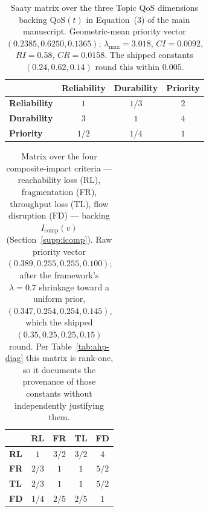 \documentclass[preprint,3p]{elsarticle}
\begin{document}
\begin{table}[htbp]
\centering
\small
\caption{Saaty matrix over the three Topic QoS dimensions backing $\text{QoS}(t)$ in Equation~(3) of the main manuscript. Geometric-mean priority vector $(0.2385, 0.6250, 0.1365)$; $\lambda_{\max} = 3.018$, $CI = 0.0092$, $RI = 0.58$, $CR = 0.0158$. The shipped constants $(0.24, 0.62, 0.14)$ round this within $0.005$.}
\label{tab:ahp-qos}
\begin{tabular}{lccc}
\toprule
 & \textbf{Reliability} & \textbf{Durability} & \textbf{Priority} \\
\midrule
\textbf{Reliability} & $1$ & $1/3$ & $2$ \\
\textbf{Durability} & $3$ & $1$ & $4$ \\
\textbf{Priority} & $1/2$ & $1/4$ & $1$ \\
\bottomrule
\end{tabular}
\end{table}

\begin{table}[htbp]
\centering
\small
\caption{Matrix over the four composite-impact criteria --- reachability loss (RL), fragmentation (FR), throughput loss (TL), flow disruption (FD) --- backing $I_{\text{comp}}(v)$ (Section~\ref{supp:icomp}). Raw priority vector $(0.389, 0.255, 0.255, 0.100)$; after the framework's $\lambda = 0.7$ shrinkage toward a uniform prior, $(0.347, 0.254, 0.254, 0.145)$, which the shipped $(0.35, 0.25, 0.25, 0.15)$ round. Per Table~\ref{tab:ahp-diag} this matrix is rank-one, so it documents the provenance of those constants without independently justifying them.}
\label{tab:ahp-impact}
\begin{tabular}{lcccc}
\toprule
 & \textbf{RL} & \textbf{FR} & \textbf{TL} & \textbf{FD} \\
\midrule
\textbf{RL} & $1$ & $3/2$ & $3/2$ & $4$ \\
\textbf{FR} & $2/3$ & $1$ & $1$ & $5/2$ \\
\textbf{TL} & $2/3$ & $1$ & $1$ & $5/2$ \\
\textbf{FD} & $1/4$ & $2/5$ & $2/5$ & $1$ \\
\bottomrule
\end{tabular}
\end{table}
\end{document}
